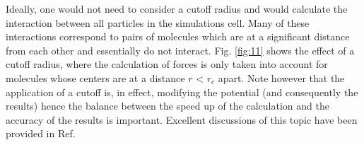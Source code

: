 \documentclass[9pt,bestpractices]{livecoms}
\begin{document}

Ideally, one would not need to consider a cutoff radius and would calculate the
interaction between all particles in the simulations cell. Many of these
interactions correspond to pairs of molecules which are at a significant
distance from each other and essentially do not interact. Fig. \ref{fig:11} shows the
effect of a cutoff radius, where the calculation of forces is only taken into
account for molecules whose centers are at a distance $r$ {\textless}
$r_{c}$ apart. Note however that the application of a cutoff is, in effect,
modifying the potential (and consequently the results) hence the balance
between the speed up of the calculation and the accuracy of the results is
important. Excellent discussions of this topic have been provided in Ref.
\citep{holcomb1993,trokhymchuk1999,mecke1997,duque2004,blas2008}
\end{document}
